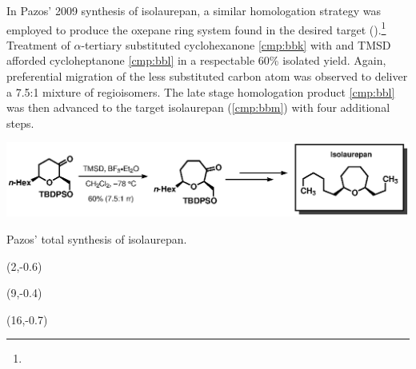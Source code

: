 In Pazos' 2009 synthesis of isolaurepan, a similar homologation strategy was
employed to produce the oxepane ring system found in the desired target
().\footnote{} Treatment of
$\alpha$-tertiary substituted cyclohexanone \ref{cmp:bbk} with  and
TMSD afforded cycloheptanone \ref{cmp:bbl} in a respectable 60\% isolated yield.
Again, preferential migration of the less substituted carbon atom was observed
to deliver a 7.5:1 mixture of regioisomers. The late stage homologation product
\ref{cmp:bbl} was then advanced to the target isolaurepan (\ref{cmp:bbm}) with
four additional steps.
\begin{Scheme}[h]
  \centering \includegraphics[scale=0.8]{chp_singlecarbon/images/pazos}
  \caption{Pazos' total synthesis of isolaurepan.}
\begin{textblock}{1}(2,-0.6)  \end{textblock}
\begin{textblock}{1}(9,-0.4)  \end{textblock}
\begin{textblock}{1}(16,-0.7)  \end{textblock}	
  \label{sch:pazos}
\end{Scheme}

